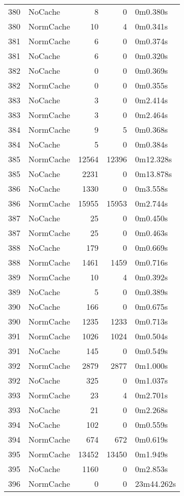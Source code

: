 \begin{tabular}{llrrl}
380 & NoCache & 8 & 0 & 0m0.380s \\
380 & NormCache & 10 & 4 & 0m0.341s \\
381 & NormCache & 6 & 0 & 0m0.374s \\
381 & NoCache & 6 & 0 & 0m0.320s \\
382 & NoCache & 0 & 0 & 0m0.369s \\
382 & NormCache & 0 & 0 & 0m0.355s \\
383 & NoCache & 3 & 0 & 0m2.414s \\
383 & NormCache & 3 & 0 & 0m2.464s \\
384 & NormCache & 9 & 5 & 0m0.368s \\
384 & NoCache & 5 & 0 & 0m0.384s \\
385 & NormCache & 12564 & 12396 & 0m12.328s \\
385 & NoCache & 2231 & 0 & 0m13.878s \\
386 & NoCache & 1330 & 0 & 0m3.558s \\
386 & NormCache & 15955 & 15953 & 0m2.744s \\
387 & NoCache & 25 & 0 & 0m0.450s \\
387 & NormCache & 25 & 0 & 0m0.463s \\
388 & NoCache & 179 & 0 & 0m0.669s \\
388 & NormCache & 1461 & 1459 & 0m0.716s \\
389 & NormCache & 10 & 4 & 0m0.392s \\
389 & NoCache & 5 & 0 & 0m0.389s \\
390 & NoCache & 166 & 0 & 0m0.675s \\
390 & NormCache & 1235 & 1233 & 0m0.713s \\
391 & NormCache & 1026 & 1024 & 0m0.504s \\
391 & NoCache & 145 & 0 & 0m0.549s \\
392 & NormCache & 2879 & 2877 & 0m1.000s \\
392 & NoCache & 325 & 0 & 0m1.037s \\
393 & NormCache & 23 & 4 & 0m2.701s \\
393 & NoCache & 21 & 0 & 0m2.268s \\
394 & NoCache & 102 & 0 & 0m0.559s \\
394 & NormCache & 674 & 672 & 0m0.619s \\
395 & NormCache & 13452 & 13450 & 0m1.949s \\
395 & NoCache & 1160 & 0 & 0m2.853s \\
396 & NormCache & 0 & 0 & 23m44.262s \\

\end{tabular}
